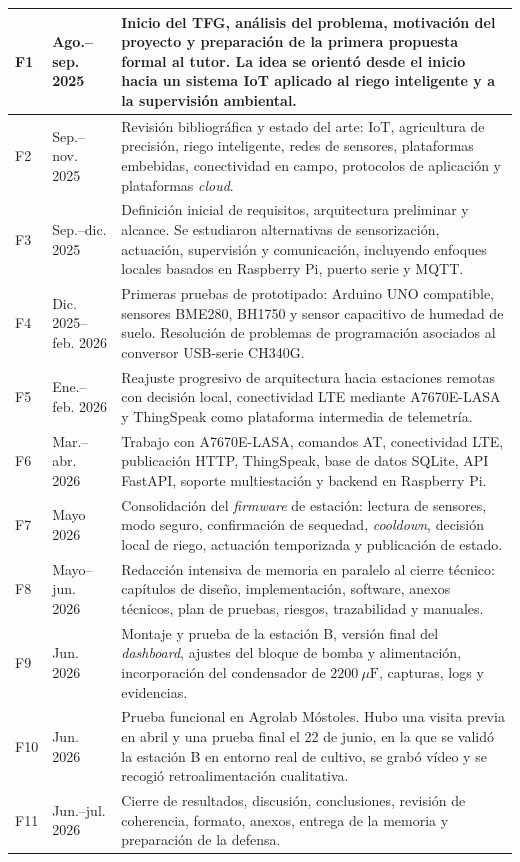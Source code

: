 \begin{longtable}{|p{}|p{}|p{}|}
F1 & Ago.--sep. 2025 & Inicio del TFG, análisis del problema, motivación del proyecto y preparación de la primera propuesta formal al tutor. La idea se orientó desde el inicio hacia un sistema IoT aplicado al riego inteligente y a la supervisión ambiental. \\
\hline
F2 & Sep.--nov. 2025 & Revisión bibliográfica y estado del arte: IoT, agricultura de precisión, riego inteligente, redes de sensores, plataformas embebidas, conectividad en campo, protocolos de aplicación y plataformas \textit{cloud}. \\
\hline
F3 & Sep.--dic. 2025 & Definición inicial de requisitos, arquitectura preliminar y alcance. Se estudiaron alternativas de sensorización, actuación, supervisión y comunicación, incluyendo enfoques locales basados en Raspberry Pi, puerto serie y MQTT. \\
\hline
F4 & Dic. 2025--feb. 2026 & Primeras pruebas de prototipado: Arduino UNO compatible, sensores BME280, BH1750 y sensor capacitivo de humedad de suelo. Resolución de problemas de programación asociados al conversor USB-serie CH340G. \\
\hline
F5 & Ene.--feb. 2026 & Reajuste progresivo de arquitectura hacia estaciones remotas con decisión local, conectividad LTE mediante A7670E-LASA y ThingSpeak como plataforma intermedia de telemetría. \\
\hline
F6 & Mar.--abr. 2026 & Trabajo con A7670E-LASA, comandos AT, conectividad LTE, publicación HTTP, ThingSpeak, base de datos SQLite, API FastAPI, soporte multiestación y backend en Raspberry Pi. \\
\hline
F7 & Mayo 2026 & Consolidación del \textit{firmware} de estación: lectura de sensores, modo seguro, confirmación de sequedad, \textit{cooldown}, decisión local de riego, actuación temporizada y publicación de estado. \\
\hline
F8 & Mayo--jun. 2026 & Redacción intensiva de memoria en paralelo al cierre técnico: capítulos de diseño, implementación, software, anexos técnicos, plan de pruebas, riesgos, trazabilidad y manuales. \\
\hline
F9 & Jun. 2026 & Montaje y prueba de la estación B, versión final del \textit{dashboard}, ajustes del bloque de bomba y alimentación, incorporación del condensador de \(2200~\mu\mathrm{F}\), capturas, logs y evidencias. \\
\hline
F10 & Jun. 2026 & Prueba funcional en Agrolab Móstoles. Hubo una visita previa en abril y una prueba final el 22 de junio, en la que se validó la estación B en entorno real de cultivo, se grabó vídeo y se recogió retroalimentación cualitativa. \\
\hline
F11 & Jun.--jul. 2026 & Cierre de resultados, discusión, conclusiones, revisión de coherencia, formato, anexos, entrega de la memoria y preparación de la defensa. \\
\hline
\end{longtable}


